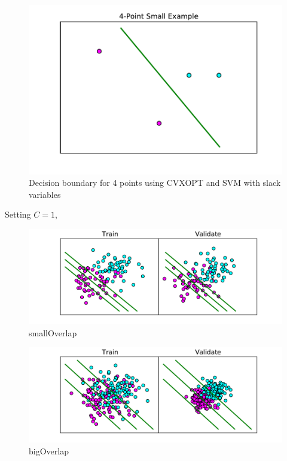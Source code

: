 \documentclass[10pt]{article}
\begin{document}
\begin{figure}[!ht]
	\centering
	\includegraphics[width=\textwidth]{exercise1-1.pdf}
	\caption{Decision boundary for 4 points using CVXOPT and SVM with slack variables}
	\label{fig:1-1}
\end{figure}

Setting $C = 1$, 

\begin{figure}[!ht]
	\centering
	\includegraphics[width=\textwidth]{1-2-smallOverlap.pdf}
	\caption{smallOverlap}
	\label{fig:1-2-smalloverlap}
\end{figure}

\begin{figure}[!ht]
	\centering
	\includegraphics[width=\textwidth]{1-2-bigOverlap.pdf}
	\caption{bigOverlap}
	\label{fig:1-2-bigoverlap}
\end{figure}
\end{document}
